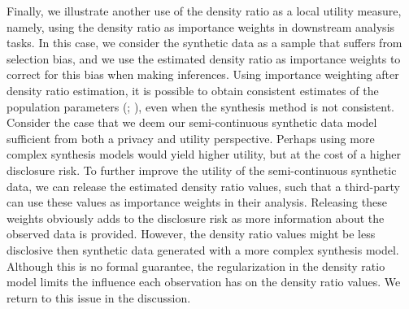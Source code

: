 \documentclass[
]{article}
\begin{document}
Finally, we illustrate another use of the density ratio as a local
utility measure, namely, using the density ratio as importance weights
in downstream analysis tasks. In this case, we consider the synthetic
data as a sample that suffers from selection bias, and we use the
estimated density ratio as importance weights to correct for this bias
when making inferences. Using importance weighting after density ratio
estimation, it is possible to obtain consistent estimates of the
population parameters (; ), even when the synthesis method is not consistent.
Consider the case that we deem our semi-continuous synthetic data model
sufficient from both a privacy and utility perspective. Perhaps using
more complex synthesis models would yield higher utility, but at the
cost of a higher disclosure risk. To further improve the utility of the
semi-continuous synthetic data, we can release the estimated density
ratio values, such that a third-party can use these values as importance
weights in their analysis. Releasing these weights obviously adds to the
disclosure risk as more information about the observed data is provided.
However, the density ratio values might be less disclosive then
synthetic data generated with a more complex synthesis model. Although
this is no formal guarantee, the regularization in the density ratio
model limits the influence each observation has on the density ratio
values. We return to this issue in the discussion.

\linespread{1}
\end{document}
